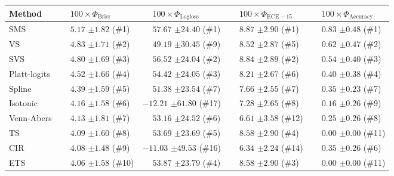 \begin{tabular}{lllll}
\toprule
Method & $\phantom{-} 100 \times \Phi_\mathrm{Brier}$ & $\phantom{-} 100 \times \Phi_\mathrm{Logloss}$ & $\phantom{-} 100 \times \Phi_\mathrm{ECE-15}$ & $\phantom{-} 100 \times \Phi_\mathrm{Accuracy}$ \\
\midrule
SMS & $\phantom{-}5.17$ {\tiny $\pm 1.82$} (\#1) & $\phantom{-}57.67$ {\tiny $\pm 24.40$} (\#1) & $\phantom{-}8.87$ {\tiny $\pm 2.90$} (\#1) & $\phantom{-}0.83$ {\tiny $\pm 0.48$} (\#1) \\
VS & $\phantom{-}4.83$ {\tiny $\pm 1.71$} (\#2) & $\phantom{-}49.19$ {\tiny $\pm 30.45$} (\#9) & $\phantom{-}8.52$ {\tiny $\pm 2.87$} (\#5) & $\phantom{-}0.62$ {\tiny $\pm 0.47$} (\#2) \\
SVS & $\phantom{-}4.80$ {\tiny $\pm 1.69$} (\#3) & $\phantom{-}56.52$ {\tiny $\pm 24.04$} (\#2) & $\phantom{-}8.84$ {\tiny $\pm 2.89$} (\#2) & $\phantom{-}0.54$ {\tiny $\pm 0.40$} (\#3) \\
Platt-logits & $\phantom{-}4.52$ {\tiny $\pm 1.66$} (\#4) & $\phantom{-}54.42$ {\tiny $\pm 24.05$} (\#3) & $\phantom{-}8.21$ {\tiny $\pm 2.67$} (\#6) & $\phantom{-}0.40$ {\tiny $\pm 0.38$} (\#4) \\
Spline & $\phantom{-}4.39$ {\tiny $\pm 1.59$} (\#5) & $\phantom{-}51.38$ {\tiny $\pm 23.54$} (\#7) & $\phantom{-}7.66$ {\tiny $\pm 2.55$} (\#7) & $\phantom{-}0.35$ {\tiny $\pm 0.23$} (\#7) \\
Isotonic & $\phantom{-}4.16$ {\tiny $\pm 1.58$} (\#6) & $-12.21$ {\tiny $\pm 61.80$} (\#17) & $\phantom{-}7.28$ {\tiny $\pm 2.65$} (\#8) & $\phantom{-}0.16$ {\tiny $\pm 0.26$} (\#9) \\
Venn-Abers & $\phantom{-}4.13$ {\tiny $\pm 1.81$} (\#7) & $\phantom{-}53.16$ {\tiny $\pm 24.52$} (\#6) & $\phantom{-}6.61$ {\tiny $\pm 3.58$} (\#12) & $\phantom{-}0.25$ {\tiny $\pm 0.26$} (\#8) \\
TS & $\phantom{-}4.09$ {\tiny $\pm 1.60$} (\#8) & $\phantom{-}53.69$ {\tiny $\pm 23.69$} (\#5) & $\phantom{-}8.58$ {\tiny $\pm 2.90$} (\#4) & $\phantom{-}0.00$ {\tiny $\pm 0.00$} (\#11) \\
CIR & $\phantom{-}4.08$ {\tiny $\pm 1.48$} (\#9) & $-11.03$ {\tiny $\pm 49.53$} (\#16) & $\phantom{-}6.34$ {\tiny $\pm 2.24$} (\#14) & $\phantom{-}0.35$ {\tiny $\pm 0.26$} (\#6) \\
ETS & $\phantom{-}4.06$ {\tiny $\pm 1.58$} (\#10) & $\phantom{-}53.87$ {\tiny $\pm 23.79$} (\#4) & $\phantom{-}8.58$ {\tiny $\pm 2.90$} (\#3) & $\phantom{-}0.00$ {\tiny $\pm 0.00$} (\#11) \\

\end{tabular}
